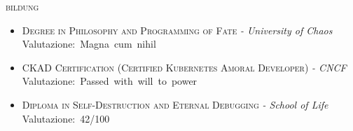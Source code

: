 \documentclass[11pt, a4paper]{article}
\newcommand{\dates}[1]{\hfill\mbox{#1}} %
\newcommand{\headright}[1]{\vspace*{2.5ex}\textsc{\Large\color{cvblue}#1}\par%
     \vspace*{-2ex}{\color{cvblue}\hrulefill}\par}
\begin{document}
\begin{minipage}[t]{0.782\textwidth}
\headright{bildung}
\begin{itemize}
	\item \textsc{Degree in Philosophy and Programming of Fate} \textit{ - University of Chaos}\\ \dates{Valutazione: Magna cum nihil}
	\item \textsc{CKAD Certification (Certified Kubernetes Amoral Developer)} \textit{ - CNCF}\\ \dates{Valutazione: Passed with will to power}
	\item \textsc{Diploma in Self-Destruction and Eternal Debugging} \textit{ - School of Life}\\ \dates{Valutazione: 42/100}
\end{itemize}


\end{minipage}
\end{document}
